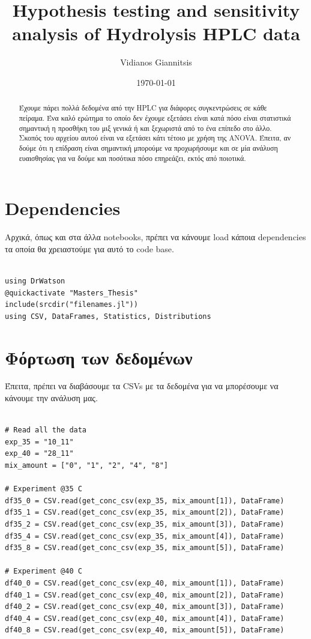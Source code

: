 \documentclass[11pt]{article}
\author{Vidianos Giannitsis}
\date{\today}
\title{Hypothesis testing and sensitivity analysis of Hydrolysis HPLC data}
\begin{document}
\maketitle
\tableofcontents

\begin{abstract}
Έχουμε πάρει πολλά δεδομένα από την HPLC για διάφορες συγκεντρώσεις σε κάθε πείραμα. Ένα καλό ερώτημα το οποίο δεν έχουμε εξετάσει είναι κατά πόσο είναι στατιστικά σημαντική η προσθήκη του μιξ γενικά ή και ξεχωριστά από το ένα επίπεδο στο άλλο. Σκοπός του αρχείου αυτού είναι να εξετάσει κάτι τέτοιο με χρήση της ANOVA. Έπειτα, αν δούμε ότι η επίδραση είναι σημαντική μπορούμε να προχωρήσουμε και σε μία ανάλυση ευαισθησίας για να δούμε και ποσότικα πόσο επηρεάζει, εκτός από ποιοτικά.
\end{abstract}

\section{Dependencies}
\label{sec:orgeb58c9a}
Αρχικά, όπως και στα άλλα notebooks, πρέπει να κάνουμε load κάποια dependencies τα οποία θα χρειαστούμε για αυτό το code base.

\begin{verbatim}

using DrWatson
@quickactivate "Masters_Thesis"
include(srcdir("filenames.jl"))
using CSV, DataFrames, Statistics, Distributions

\end{verbatim}

\section{Φόρτωση των δεδομένων}
\label{sec:org06ad3ce}
Έπειτα, πρέπει να διαβάσουμε τα CSVs με τα δεδομένα για να μπορέσουμε να κάνουμε την ανάλυση μας.

\begin{verbatim}

# Read all the data
exp_35 = "10_11"
exp_40 = "28_11"
mix_amount = ["0", "1", "2", "4", "8"]

# Experiment @35 C
df35_0 = CSV.read(get_conc_csv(exp_35, mix_amount[1]), DataFrame)
df35_1 = CSV.read(get_conc_csv(exp_35, mix_amount[2]), DataFrame)
df35_2 = CSV.read(get_conc_csv(exp_35, mix_amount[3]), DataFrame)
df35_4 = CSV.read(get_conc_csv(exp_35, mix_amount[4]), DataFrame)
df35_8 = CSV.read(get_conc_csv(exp_35, mix_amount[5]), DataFrame)

# Experiment @40 C
df40_0 = CSV.read(get_conc_csv(exp_40, mix_amount[1]), DataFrame)
df40_1 = CSV.read(get_conc_csv(exp_40, mix_amount[2]), DataFrame)
df40_2 = CSV.read(get_conc_csv(exp_40, mix_amount[3]), DataFrame)
df40_4 = CSV.read(get_conc_csv(exp_40, mix_amount[4]), DataFrame)
df40_8 = CSV.read(get_conc_csv(exp_40, mix_amount[5]), DataFrame)

\end{verbatim}
\end{document}
